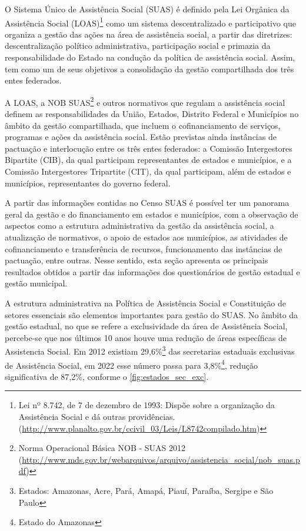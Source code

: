 \documentclass[
  brazilian]{report}
\begin{document}
O Sistema Único de Assistência Social (SUAS) é definido pela Lei
Orgânica da Assistência Social
(LOAS)\footnote{Lei nº 8.742, de 7 de dezembro de 1993: Dispõe sobre a organização da Assistência Social e dá outras providências. (\url{http://www.planalto.gov.br/ccivil_03/Leis/L8742compilado.htm})}
como um sistema descentralizado e participativo que organiza a gestão
das ações na área de assistência social, a partir das diretrizes:
descentralização político administrativa, participação social e primazia
da responsabilidade do Estado na condução da política de assistência
social. Assim, tem como um de seus objetivos a consolidação da gestão
compartilhada dos três entes federados.

A LOAS, a NOB
SUAS\footnote{Norma Operacional Básica NOB - SUAS 2012 (\url{http://www.mds.gov.br/webarquivos/arquivo/assistencia_social/nob_suas.pdf})}
e outros normativos que regulam a assistência social definem as
responsabilidades da União, Estados, Distrito Federal e Municípios no
âmbito da gestão compartilhada, que incluem o cofinanciamento de
serviços, programas e ações da assistência social. Estão previstas ainda
instâncias de pactuação e interlocução entre os três entes federados: a
Comissão Intergestores Bipartite (CIB), da qual participam
representantes de estados e municípios, e a Comissão Intergestores
Tripartite (CIT), da qual participam, além de estados e municípios,
representantes do governo federal.

A partir das informações contidas no Censo SUAS é possível ter um
panorama geral da gestão e do financiamento em estados e municípios, com
a observação de aspectos como a estrutura administrativa da gestão da
assistência social, a atualização de normativos, o apoio de estados aos
municípios, as atividades de cofinanciamento e transferência de
recursos, funcionamento das instâncias de pactuação, entre outras. Nesse
sentido, esta seção apresenta os principais resultados obtidos a partir
das informações dos questionários de gestão estadual e gestão municipal.

A estrutura administrativa na Política de Assistência Social e
Constituição de setores essenciais são elementos importantes para gestão
do SUAS. No âmbito da gestão estadual, no que se refere a exclusividade
da área de Assistência Social, percebe-se que nos últimos 10 anos houve
uma redução de áreas específicas de Assistencia Social. Em 2012 existiam
29,6\%\footnote{Estados: Amazonas, Acre, Pará, Amapá, Piauí, Paraíba, Sergipe e São Paulo}
das secretarias estaduais exclusivas de Assistência Social, em 2022 esse
número passa para 3,8\%\footnote{Estado do Amazonas}, redução
significativa de 87,2\%, conforme o \cref{fig:estados_sec_exc}.
\end{document}
